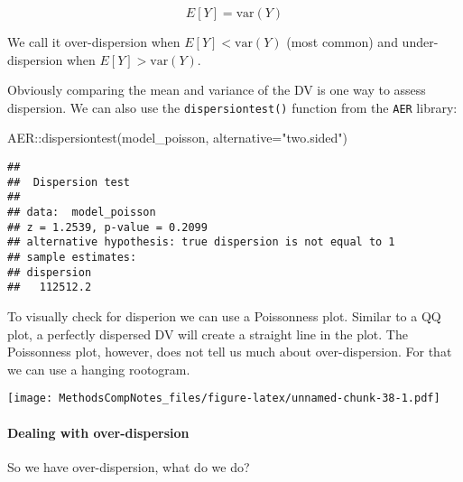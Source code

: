 \documentclass[
]{article}
\newenvironment{Shaded}{\begin{snugshade}}{\end{snugshade}}
\newcommand{\AttributeTok}[1]{\textcolor[rgb]{0.77,0.63,0.00}{#1}}
\newcommand{\CommentTok}[1]{\textcolor[rgb]{0.56,0.35,0.01}{\textit{#1}}}
\newcommand{\FunctionTok}[1]{\textcolor[rgb]{0.00,0.00,0.00}{#1}}
\newcommand{\NormalTok}[1]{#1}
\newcommand{\SpecialCharTok}[1]{\textcolor[rgb]{0.00,0.00,0.00}{#1}}
\newcommand{\StringTok}[1]{\textcolor[rgb]{0.31,0.60,0.02}{#1}}
\begin{document}
\[E[Y]=\mathrm{var}(Y)\]

We call it over-dispersion when \(E[Y]<\mathrm{var}(Y)\) (most common)
and under-dispersion when \(E[Y]>\mathrm{var}(Y)\).

Obviously comparing the mean and variance of the DV is one way to assess
dispersion. We can also use the \texttt{dispersiontest()} function from
the \texttt{AER} library:

\begin{Shaded}
\begin{Highlighting}[]
\NormalTok{AER}\SpecialCharTok{::}\FunctionTok{dispersiontest}\NormalTok{(model\_poisson, }\AttributeTok{alternative=}\StringTok{"two.sided"}\NormalTok{)}
\end{Highlighting}
\end{Shaded}

\begin{verbatim}
## 
##  Dispersion test
## 
## data:  model_poisson
## z = 1.2539, p-value = 0.2099
## alternative hypothesis: true dispersion is not equal to 1
## sample estimates:
## dispersion 
##   112512.2
\end{verbatim}

To visually check for disperion we can use a Poissonness plot. Similar
to a QQ plot, a perfectly dispersed DV will create a straight line in
the plot. The Poissonness plot, however, does not tell us much about
over-dispersion. For that we can use a hanging rootogram.

\begin{Shaded}
\end{Shaded}

\texttt{[image: MethodsCompNotes\_files/figure-latex/unnamed-chunk-38-1.pdf]}

\hypertarget{dealing-with-over-dispersion}{%
\paragraph{Dealing with
over-dispersion}\label{dealing-with-over-dispersion}}

So we have over-dispersion, what do we do?
\end{document}

